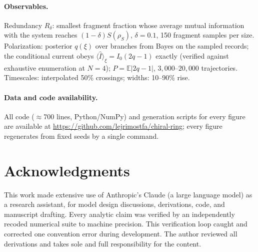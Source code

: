 \documentclass[11pt]{article}
\newcommand{\Iop}{\hat{I}}
\begin{document}
\paragraph{Observables.}
Redundancy $R_\delta$: smallest fragment fraction whose average mutual information with the system reaches $(1-\delta)S(\rho_S)$, $\delta=0.1$, 150 fragment samples per size. Polarization: posterior $q(\xi)$ over branches from Bayes on the sampled records; the conditional current obeys $\langle\Iop\rangle_\xi=I_0(2q-1)$ exactly (verified against exhaustive enumeration at $N=4$); $P=\mathbb E|2q-1|$, $3{,}000$--$20{,}000$ trajectories. Timescales: interpolated 50\% crossings; widths: 10--90\% rise.

\paragraph{Data and code availability.}
All code ($\approx$700 lines, Python/NumPy) and generation scripts for every figure are available at \url{https://github.com/lejrimostfa/chiral-ring}; every figure regenerates from fixed seeds by a single command.


\section*{Acknowledgments}
This work made extensive use of Anthropic's Claude (a large language model) as a research assistant, for model design discussions, derivations, code, and manuscript drafting. Every analytic claim was verified by an independently recoded numerical suite to machine precision. This verification loop caught and corrected one convention error during development. The author reviewed all derivations and takes sole and full responsibility for the content.
\end{document}
